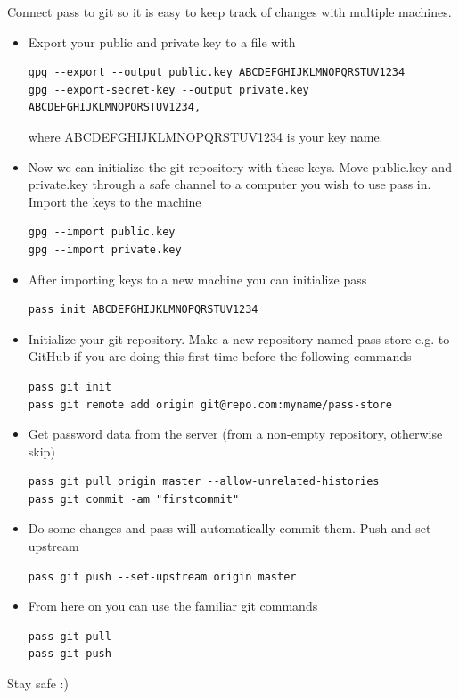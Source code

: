 \documentclass{article}
\begin{document}
Connect pass to git so it is easy to keep track of changes with multiple machines.

\begin{itemize}
\item Export your public and private key to a file with \\
  \begin{verbatim}
gpg --export --output public.key ABCDEFGHIJKLMNOPQRSTUV1234 
gpg --export-secret-key --output private.key ABCDEFGHIJKLMNOPQRSTUV1234,
  \end{verbatim}
  where ABCDEFGHIJKLMNOPQRSTUV1234 is your key name.\\
\item Now we can initialize the git repository with these keys. Move public.key and private.key through a safe channel to a computer you wish to use pass in. Import the keys to the machine \\
\begin{verbatim}
gpg --import public.key
gpg --import private.key
\end{verbatim}
\item After importing keys to a new machine you can initialize pass
\begin{verbatim}
pass init ABCDEFGHIJKLMNOPQRSTUV1234
\end{verbatim}

\item Initialize your git repository. Make a new repository named pass-store e.g. to GitHub if you are doing this first time before the following commands\\
\begin{verbatim}
pass git init 
pass git remote add origin git@repo.com:myname/pass-store
 \end{verbatim}
\item Get password data from the server (from a non-empty repository, otherwise skip)
\begin{verbatim}
pass git pull origin master --allow-unrelated-histories
pass git commit -am "firstcommit"
\end{verbatim}
\item Do some changes and pass will automatically commit them. Push and set upstream \\
\begin{verbatim}
pass git push --set-upstream origin master 
\end{verbatim}
\item From here on you can use the familiar git commands \\
\begin{verbatim}
pass git pull 
pass git push 
\end{verbatim}
\end{itemize}
Stay safe :)
\end{document}
